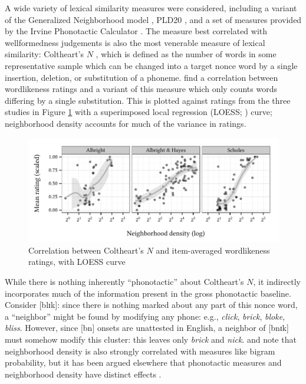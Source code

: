 A wide variety of lexical similarity measures were considered, including a variant of the Generalized Neighborhood model \citep{Bailey2001}, PLD20 \citep{Suarez2011}, and a set of measures provided by the Irvine Phonotactic Calculator \citep{Vaden2009}. 
The measure best correlated with wellformedness judgements is also the most venerable measure of lexical similarity: Coltheart's $N$ \citep{Coltheart1977}, which is defined as the number of words in some representative sample which can be changed into a target nonce word by a single insertion, deletion, or substitution of a phoneme.
\citet{Greenberg1964} find a correlation between wordlikeness ratings and a variant of this measure which only counts words differing by a single substitution.
This is plotted against ratings from the three studies in Figure \ref{neighborhood} with a superimposed local regression (LOESS; \citealt{Cleveland1988}) curve; neighborhood density accounts for much of the variance in ratings.


\begin{figure}[t]
\centering
\includegraphics{neighborhood.pdf}
\caption{Correlation between Coltheart's $N$ and item-averaged wordlikeness ratings, with LOESS curve}
\label{neighborhood}
\end{figure}

While there is nothing inherently ``phonotactic'' about Coltheart's $N$, it indirectly incorporates much of the information present in the gross phonotactic baseline. 
Consider [blɪk]: since there is nothing marked about any part of this nonce word, a ``neighbor'' might be found by modifying any phone: e.g., \emph{click}, \emph{brick}, \emph{bloke}, \emph{bliss}. 
However, since [bn] onsets are unattested in English, a neighbor of [bnɪk] must somehow modify this cluster: this leaves only \emph{brick} and \emph{nick}. 
\citet{Bailey2001} and \citet{Frauenfelder1993} note that neighborhood density is also strongly correlated with measures like bigram probability, but it has been argued elsewhere that phonotactic measures and neighborhood density have distinct effects \citep[e.g.,][]{Berent2003,Pitt1998b,Vitevitch1998,Vitevitch1999a}.


